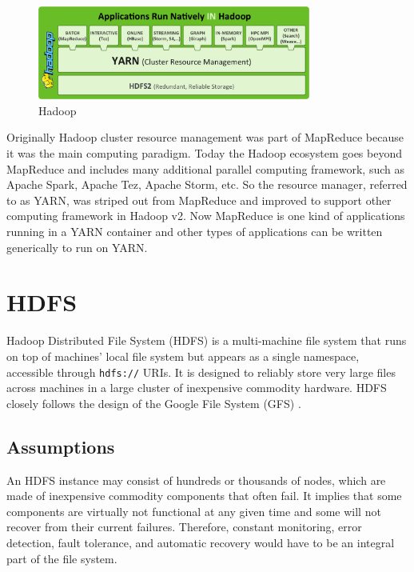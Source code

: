 \documentclass[12pt]{book}
\begin{document}
\begin{figure}[t]
\includegraphics[width=0.8\textwidth]{images/hadoop.png}
\centering
\caption{Hadoop}
\end{figure}

Originally Hadoop cluster resource management was part of MapReduce because it was the main computing paradigm. Today the Hadoop ecosystem goes beyond MapReduce and includes many additional parallel computing framework, such as Apache Spark, Apache Tez, Apache Storm, etc. So the resource manager, referred to as YARN, was striped out from MapReduce and improved to support other computing framework in Hadoop v2. Now MapReduce is one kind of applications running in a YARN container and other types of applications can be written generically to run on YARN.

\section[HDFS]
{HDFS}
Hadoop Distributed File System (HDFS) \cite{HDFS} is a multi-machine file system that runs on top of machines' local file system but appears as a single namespace, accessible through \texttt{hdfs://} URIs. It is designed to reliably store very large files across machines in a large cluster of inexpensive commodity hardware. HDFS closely follows the design of the Google File System (GFS) \cite{Ghemawat:2003:GFS, McKusick:2009:GEF}.

\subsection{Assumptions}
An HDFS instance may consist of hundreds or thousands of nodes, which are made of inexpensive commodity components that often fail. It implies that some components are virtually not functional at any given time and some will not recover from their current failures. Therefore, constant monitoring, error detection, fault tolerance, and automatic recovery would have to be an integral part of the file system.
\end{document}
